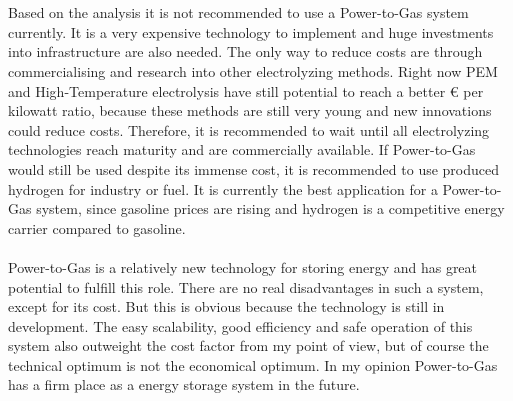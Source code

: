 \begin{parcolumns}[colwidths={1=2.5 cm, 2=10 cm, 3=2.5 cm}]{3}
{\\ \\
Based on the analysis it is not recommended to use a Power-to-Gas system currently. It is a very expensive technology to implement and huge investments into infrastructure are also needed. The only way to reduce costs are through commercialising and research into other electrolyzing methods. Right now PEM and High-Temperature electrolysis have still potential to reach a better \euro{ } per kilowatt ratio, because these methods are still very young and new innovations could reduce costs. Therefore, it is recommended to wait until all electrolyzing technologies reach maturity and are commercially available. If Power-to-Gas would still be used despite its immense cost, it is recommended to use produced hydrogen for industry or fuel. It is currently the best application for a Power-to-Gas system, since gasoline prices are rising and hydrogen is a competitive energy carrier compared to gasoline.  \\ \\
Power-to-Gas is a relatively new technology for storing energy and has great potential to fulfill this role. There are no real disadvantages in such a system, except for its cost. But this is obvious because the technology is still in development. The easy scalability, good efficiency and safe operation of this system also outweight the cost factor from my point of view, but of course the technical optimum is not the economical optimum. In my opinion Power-to-Gas has a firm place as a energy storage system in the future.
}


\end{parcolumns}
